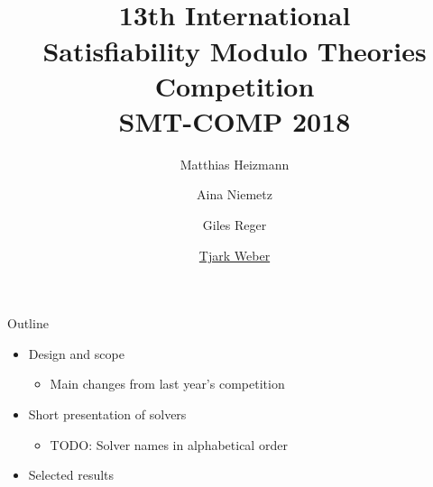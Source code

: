 \documentclass{beamer}
\title[SMT-COMP 2018]{${}$\\[3.5em]13th International\\
Satisfiability Modulo Theories\\
Competition\\[.7em]
SMT-COMP 2018\\[3em]}
\author{Matthias Heizmann \and Aina Niemetz\\ \and Giles Reger \and
  \underline{Tjark Weber}}
\institute{}
\date{}
\begin{document}

\frame{\titlepage}
\logo{}


\section{}%
\subsection{}%


\begin{frame}{Outline}
  \begin{itemize}
  \item Design and scope

    \smallskip

    \begin{itemize}
    \item Main changes from last year's competition
    \end{itemize}

    \vfill

  \item Short presentation of solvers

    \smallskip

    \begin{itemize}
    \item TODO: Solver names in alphabetical order
    \end{itemize}

    \vfill

  \item Selected results
  \end{itemize}
\end{frame}


\begin{frame}{}
  \begin{center}
    \vfill
      {\huge {}}
    \vfill
  \end{center}
\end{frame}

\end{document}
